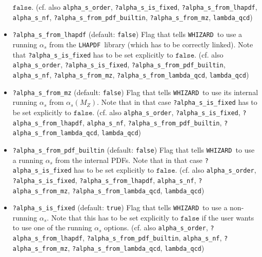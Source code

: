 \documentclass[12pt]{book}
\newcommand{\ttt}[1]{\texttt{#1}}
\newcommand{\whizard}{\texttt{WHIZARD}}
\newcommand{\lhapdf}{\texttt{LHAPDF}}
\begin{document}
\begin{itemize}
$\ttt{false}$. (cf. also \ttt{alpha\_s\_order},
\ttt{?alpha\_s\_is\_fixed}, \ttt{?alpha\_s\_from\_lhapdf},
\ttt{alpha\_s\_nf}, \ttt{?alpha\_s\_from\_pdf\_builtin}, \newline 
\ttt{?alpha\_s\_from\_mz}, 
\ttt{lambda\_qcd})   
\item
\ttt{?alpha\_s\_from\_lhapdf} \qquad (default: \ttt{false}) \newline
Flag that tells \whizard\ to use a running $\alpha_s$ from the
\lhapdf\ library (which has to be correctly linked). Note that
\ttt{?alpha\_s\_is\_fixed} has to be set explicitly to
$\ttt{false}$. (cf. also
\ttt{alpha\_s\_order}, \ttt{?alpha\_s\_is\_fixed},
\ttt{?alpha\_s\_from\_pdf\_builtin}, \ttt{alpha\_s\_nf},
\ttt{?alpha\_s\_from\_mz}, \ttt{?alpha\_s\_from\_lambda\_qcd},
\ttt{lambda\_qcd})   
\item
\ttt{?alpha\_s\_from\_mz} \qquad (default: \ttt{false})
\newline 
Flag that tells \whizard\ to use its internal running $\alpha_s$ from
$\alpha_s(M_Z)$. Note that in that case \ttt{?alpha\_s\_is\_fixed} has 
to be set explicitly to $\ttt{false}$. (cf. also
\ttt{alpha\_s\_order}, \ttt{?alpha\_s\_is\_fixed},
\ttt{?alpha\_s\_from\_lhapdf}, \ttt{alpha\_s\_nf},
\ttt{?alpha\_s\_from\_pdf\_builtin}, \newline
\ttt{?alpha\_s\_from\_lambda\_qcd}, 
\ttt{lambda\_qcd})   
\item
\ttt{?alpha\_s\_from\_pdf\_builtin} \qquad (default: \ttt{false})
\newline 
Flag that tells \whizard\ to use a running $\alpha_s$ from the
internal PDFs. Note that in that case \ttt{?alpha\_s\_is\_fixed} has
to be set explicitly to $\ttt{false}$. (cf. also
\ttt{alpha\_s\_order}, \ttt{?alpha\_s\_is\_fixed},
\ttt{?alpha\_s\_from\_lhapdf}, \ttt{alpha\_s\_nf},
\ttt{?alpha\_s\_from\_mz}, \newline \ttt{?alpha\_s\_from\_lambda\_qcd},
\ttt{lambda\_qcd})   
\item
\ttt{?alpha\_s\_is\_fixed} \qquad (default: \ttt{true}) \newline
Flag that tells \whizard\ to use a non-running $\alpha_s$. Note that
this has to be set explicitly to $\ttt{false}$ if the user wants to use
one of the running $\alpha_s$ options. (cf. also
\ttt{alpha\_s\_order}, \ttt{?alpha\_s\_from\_lhapdf},
\ttt{?alpha\_s\_from\_pdf\_builtin}, \ttt{alpha\_s\_nf},
\ttt{?alpha\_s\_from\_mz}, \newline
\ttt{?alpha\_s\_from\_lambda\_qcd}, \ttt{lambda\_qcd})  

\end{itemize}
\end{document}
